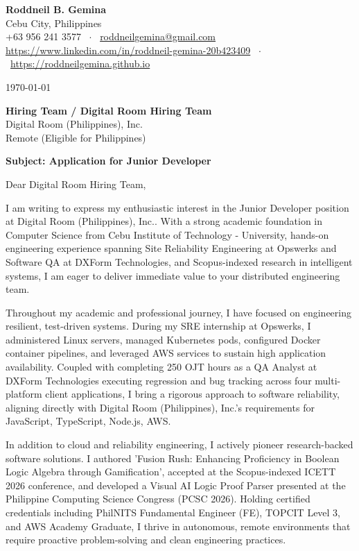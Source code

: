 \documentclass[letterpaper,11pt]{article}
\begin{document}
\textbf{Roddneil B. Gemina} \\
Cebu City, Philippines \\
+63 956 241 3577 \ $\cdot$ \ \href{mailto:roddneilgemina@gmail.com}{roddneilgemina@gmail.com} \\
\href{https://www.linkedin.com/in/roddneil-gemina-20b423409}{https://www.linkedin.com/in/roddneil-gemina-20b423409} \ $\cdot$ \ \href{https://roddneilgemina.github.io}{https://roddneilgemina.github.io}

\vspace{12pt}
\today

\vspace{8pt}
\textbf{Hiring Team / Digital Room Hiring Team} \\
Digital Room (Philippines), Inc. \\
Remote (Eligible for Philippines)

\vspace{8pt}
\textbf{Subject: Application for Junior Developer}

\vspace{4pt}
Dear Digital Room Hiring Team,

I am writing to express my enthusiastic interest in the Junior Developer position at Digital Room (Philippines), Inc.. With a strong academic foundation in Computer Science from Cebu Institute of Technology - University, hands-on engineering experience spanning Site Reliability Engineering at Opswerks and Software QA at DXForm Technologies, and Scopus-indexed research in intelligent systems, I am eager to deliver immediate value to your distributed engineering team.

Throughout my academic and professional journey, I have focused on engineering resilient, test-driven systems. During my SRE internship at Opswerks, I administered Linux servers, managed Kubernetes pods, configured Docker container pipelines, and leveraged AWS services to sustain high application availability. Coupled with completing 250 OJT hours as a QA Analyst at DXForm Technologies executing regression and bug tracking across four multi-platform client applications, I bring a rigorous approach to software reliability, aligning directly with Digital Room (Philippines), Inc.'s requirements for JavaScript, TypeScript, Node.js, AWS.

In addition to cloud and reliability engineering, I actively pioneer research-backed software solutions. I authored 'Fusion Rush: Enhancing Proficiency in Boolean Logic Algebra through Gamification', accepted at the Scopus-indexed ICETT 2026 conference, and developed a Visual AI Logic Proof Parser presented at the Philippine Computing Science Congress (PCSC 2026). Holding certified credentials including PhilNITS Fundamental Engineer (FE), TOPCIT Level 3, and AWS Academy Graduate, I thrive in autonomous, remote environments that require proactive problem-solving and clean engineering practices.
\end{document}
